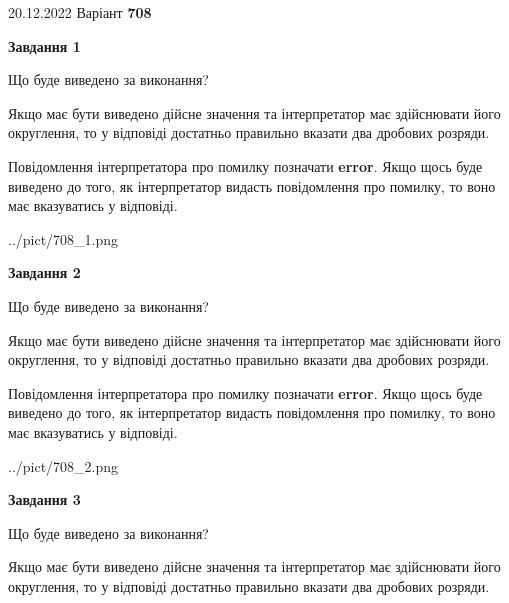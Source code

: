 \documentclass[12pt, ukrainian]{article}
\begin{document}
{20.12.2022 Варіант \No \textbf { 708 }\par}
{
\begin {Large}

{\begin {center}\textbf{Завдання 1}\end {center}}\par
Що буде виведено за виконання? \par

Якщо має бути виведено дійсне значення та інтерпретатор має здійснювати його округлення, 
то у відповіді достатньо правильно вказати два дробових розряди.

Повідомлення інтерпретатора про помилку позначати \textbf{error}.
Якщо щось буде виведено до того, як інтерпретатор видасть повідомлення про помилку, 
то воно має вказуватись у відповіді. \par

\begin{center}
	{../pict/708_1.png}
\end{center}
\newpage

{\begin {center}\textbf{Завдання 2}\end {center}}\par
Що буде виведено за виконання? \par

Якщо має бути виведено дійсне значення та інтерпретатор має здійснювати його округлення, 
то у відповіді достатньо правильно вказати два дробових розряди.

Повідомлення інтерпретатора про помилку позначати \textbf{error}.
Якщо щось буде виведено до того, як інтерпретатор видасть повідомлення про помилку, 
то воно має вказуватись у відповіді. \par

\begin{center}
	{../pict/708_2.png}
\end{center}
\newpage

{\begin {center}\textbf{Завдання 3}\end {center}}\par
Що буде виведено за виконання? \par

Якщо має бути виведено дійсне значення та інтерпретатор має здійснювати його округлення, 
то у відповіді достатньо правильно вказати два дробових розряди.


\end{Large}}
\end{document}
